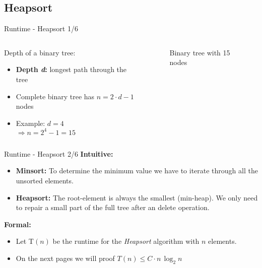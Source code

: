 \subsection{Heapsort}

\begin{frame}{Runtime - Heapsort 1/6}
  \begin{columns}
    \begin{column}{0.5\textwidth}
      Depth of a binary tree:
      \begin{itemize}
        \item
          \textbf{Depth \textit{d}:}
          longest path through the tree
        \item
          Complete binary tree has $n = 2 \cdot d - 1$ nodes
        \item
          Example: $d = 4$\\
          $\Rightarrow n = 2^4 - 1 = 15$
      \end{itemize}
    \end{column}
    \begin{column}{0.5\textwidth}
      \begin{figure}
        \begin{centering}%
          \caption{Binary tree with 15 nodes}%
          \label{fig:binary_tree}%
        \end{centering}%
      \end{figure}
    \end{column}
  \end{columns}
\end{frame}


\begin{frame}{Runtime - Heapsort 2/6}
  \textbf{Intuitive:}
  \begin{itemize}
    \item
      \textbf{Minsort:}
      To determine the minimum value we have to iterate through all the
      unsorted elements.
    \item
      \textbf{Heapsort:}
      The root-element is always the smallest (min-heap).
      We only need to repair a small part of the full tree after an delete
      operation.
  \end{itemize}
  \textbf{Formal:}
  \begin{itemize}
    \item 
      Let T$(n)$ be the runtime for the \textit{Heapsort}
      algorithm with $n$ elements.
    \item
      On the next pages we will proof $T(n) \leq C \cdot n \, \log_2 n$
  \end{itemize}
\end{frame}